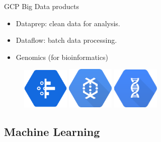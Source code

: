\documentclass{beamer}
\begin{document}
\begin{frame}[fragile]{GCP Big Data products}
  \begin{itemize}[<+->]
    \item Dataprep: clean data for analysis.
    \item Dataflow: batch data processing.
    \item Genomics (for bioinformatics)
  \end{itemize}

  \vspace{1cm}
  \begin{figure}[H]
    \includegraphics[width=0.2\textwidth]{img/dataprep}
    \hspace{1cm}   \includegraphics[width=0.2\textwidth]{img/dataflow}
    \hspace{1cm}
     \includegraphics[width=0.2\textwidth]{img/genomics}
  \end{figure}

\end{frame}

\subsection{Machine Learning}
\end{document}
